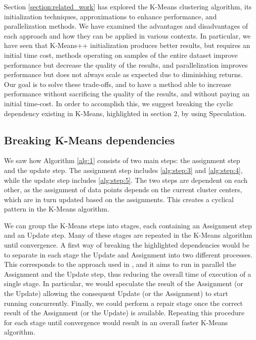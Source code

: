 Section \ref{section:related_work} has explored the K-Means clustering algorithm, its initialization techniques, approximations to enhance performance, and parallelization methods. We have examined the advantages and disadvantages of each approach and how they can be applied in various contexts. In particular, we have seen that K-Means++ initialization produces better results, but requires an initial time cost, methods operating on samples of the entire dataset improve performance but decrease the quality of the results, and parallelization improves performance but does not always scale as expected due to diminishing returns. Our goal is to solve these trade-offs, and to have a method able to increase performance without sacrificing the quality of the results, and without paying an initial time-cost.  In order to accomplish this, we suggest breaking the cyclic dependency existing in K-Means, highlighted in section 2, by using Speculation. 

\subsection{Breaking K-Means dependencies}
\label{section:breaking_dependencies}
We saw how Algorithm \ref{alg:1} consists of two main steps: the assignment step and the update step. The assignment step includes \ref{alg:step:3} and \ref{alg:step:4}, while the update step includes \ref{alg:step:5}. The two steps are dependent on each other, as the assignment of data points depends on the current cluster centers, which are in turn updated based on the assignments. This creates a cyclical pattern in the K-Means algorithm.

We can group the K-Means steps into stages, each containing an Assignment step and
an Update step. Many of these stages are repeated in the K-Means algorithm until convergence.
A first way of breaking the highlighted dependencies would be to separate in each stage the Update and Assignment into two different processes. This corresponds to the approach used in \cite{Sioulas:282304}, and it aims to run in parallel the Assignment and the Update step, thus reducing the overall time of execution of a single stage. In particular, we would speculate the result of the Assignment (or the Update) allowing the consequent Update (or the Assignment) to start running concurrently. Finally, we could perform a repair stage once the correct result of the Assignment (or the Update) is available. Repeating this procedure for each stage until convergence would result in an overall faster K-Means algorithm.

